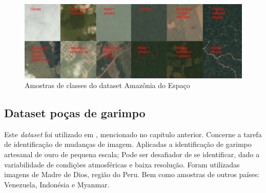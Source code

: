 \begin{figure}[!ht]
    \centering
    \includegraphics[width=0.9\columnwidth]{
        Imagens/chips.jpg
    }
    \caption{Amostras de classes do dataset Amazônia do Espaço}\label{fig:dataset}
\end{figure}



\subsection{Dataset poças de garimpo}\label{sec:Cap2_amazonia_garimpo}

Este \textit{dataset} foi utilizado em \cite{rs14071746}, mencionado no capitulo anterior. Concerne a tarefa de identificação de mudanças de imagem. Aplicadas a identificação de garimpo artesanal de ouro de pequena escala; Pode ser desafiador de se identificar, dado a variabilidade de condições atmosféricas e baixa resolução. Foram utilizadas imagens de Madre de Dios, região do Peru. Bem como amostras de outros países: Venezuela, Indonésia e Myanmar. 

